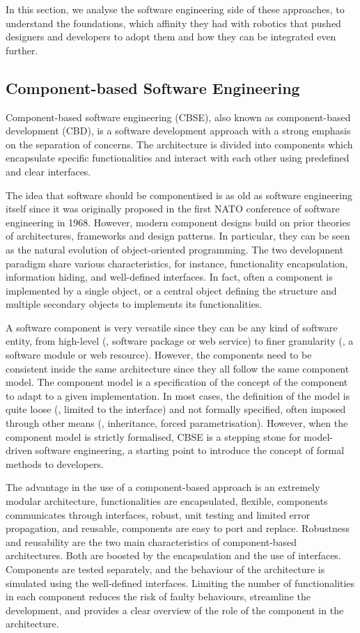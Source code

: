 In this section, we analyse the software engineering side of these approaches, to understand the foundations, which affinity they had with robotics that pushed designers and developers to adopt them and how they can be integrated even further.

\subsection{Component-based Software Engineering}
Component-based software engineering (CBSE), also known as component-based development (CBD), is a software development approach with a strong emphasis on the separation of concerns. The architecture is divided into components which encapsulate specific functionalities and interact with each other using predefined and clear interfaces.

The idea that software should be componentised is as old as software engineering itself since it was originally proposed in the first NATO conference of software engineering in 1968. However, modern component designs build on prior theories of architectures, frameworks and design patterns. In particular, they can be seen as the natural evolution of object-oriented programming. The two development paradigm share various characteristics, for instance, functionality encapsulation, information hiding, and well-defined interfaces. In fact, often a component is implemented by a single object, or a central object defining the structure and multiple secondary objects to implements its functionalities.

A software component is very versatile since they can be any kind of software entity, from high-level (\eg, software package or web service) to finer granularity (\eg, a software module or web resource). However, the components need to be consistent inside the same architecture since they all follow the same component model. The component model is a specification of the concept of the component to adapt to a given implementation. In most cases, the definition of the model is quite loose (\eg, limited to the interface) and not formally specified, often imposed through other means (\eg, inheritance, forced parametrisation). However, when the component model is strictly formalised, CBSE is a stepping stone for model-driven software engineering, a starting point to introduce the concept of formal methods to developers.

The advantage in the use of a component-based approach is an extremely modular architecture, functionalities are encapsulated, flexible, components communicates through interfaces, robust, unit testing and limited error propagation, and reusable, components are easy to port and replace. Robustness and reusability are the two main characteristics of component-based architectures. Both are boosted by the encapsulation and the use of interfaces. Components are tested separately, and the behaviour of the architecture is simulated using the well-defined interfaces. Limiting the number of functionalities in each component reduces the risk of faulty behaviours, streamline the development, and provides a clear overview of the role of the component in the architecture.

